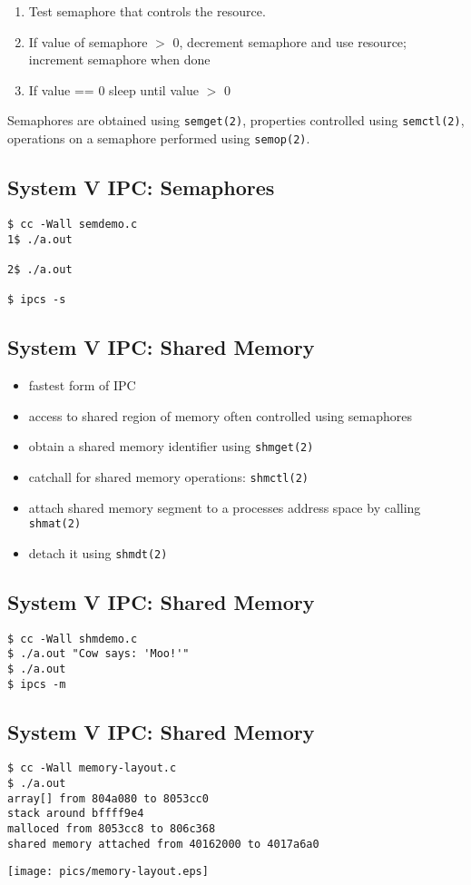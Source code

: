 \documentclass[xga]{xdvislides}
\begin{document}
\begin{enumerate}
	\item Test semaphore that controls the resource.
	\item If value of semaphore $>$ 0, decrement semaphore and use resource;
		increment semaphore when done
	\item If value == 0 sleep until value $>$ 0
\end{enumerate}
\vspace{.5in}
Semaphores are obtained using {\tt semget(2)}, properties controlled using
{\tt semctl(2)}, operations on a semaphore performed using {\tt semop(2)}.

\subsection{System V IPC: Semaphores}
\begin{verbatim}
$ cc -Wall semdemo.c
1$ ./a.out

2$ ./a.out

$ ipcs -s
\end{verbatim}

\subsection{System V IPC: Shared Memory}
\begin{itemize}
	\item fastest form of IPC
	\item access to shared region of memory often controlled using
		semaphores
	\item obtain a shared memory identifier using {\tt shmget(2)}
	\item catchall for shared memory operations: {\tt shmctl(2)}
	\item attach shared memory segment to a processes address space by
		calling {\tt shmat(2)}
	\item detach it using {\tt shmdt(2)}
\end{itemize}

\subsection{System V IPC: Shared Memory}
\begin{verbatim}
$ cc -Wall shmdemo.c
$ ./a.out "Cow says: 'Moo!'"
$ ./a.out
$ ipcs -m
\end{verbatim}

\subsection{System V IPC: Shared Memory}
\begin{verbatim}
$ cc -Wall memory-layout.c
$ ./a.out
array[] from 804a080 to 8053cc0
stack around bffff9e4
malloced from 8053cc8 to 806c368
shared memory attached from 40162000 to 4017a6a0
\end{verbatim}
\begin{center}
	\texttt{[image: pics/memory-layout.eps]}
\end{center}
\end{document}
